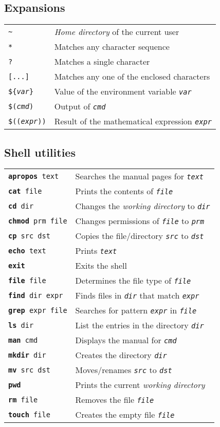 \documentclass[landscape, a4paper]{article}
\newcommand{\cl}[1]{\texttt{#1}}
\newcommand{\cv}[1]{\textit{\texttt{#1}}}
\newcommand{\shcmd}[2]{\texttt{\textbf{#1} #2}}
\begin{document}
\begin{multicols*}{3}
\subsection*{Expansions}
\begin{tabular}{ll}
\cl{\textasciitilde}    & \textit{Home directory} of the current user\\
\cl{*}                  & Matches any character sequence\\
\cl{?}                  & Matches a single character\\
\cl{[...]}              & Matches any one of the enclosed characters\\
\cl{\$\{\cv{var}\cl\}}  & Value of the environment variable \cv{var}\\
\cl{\$(\cv{cmd})}       & Output of \cv{cmd}\\
\cl{\$((\cv{expr}))}    & Result of the mathematical expression \cv{expr}
\end{tabular}

\subsection*{Shell utilities}
\begin{tabular}{ll}
\shcmd{apropos}{text}       & Searches the manual pages for \cv{text}\\
\shcmd{cat}{file}           & Prints the contents of \cv{file}\\
\shcmd{cd}{dir}             & Changes the \textit{working directory} to \cv{dir}\\
\shcmd{chmod}{prm file}     & Changes permissions of \cv{file} to \cv{prm}\\
\shcmd{cp}{src dst}         & Copies the file/directory \cv{src} to \cv{dst}\\
\shcmd{echo}{text}          & Prints \cv{text}\\
\shcmd{exit}{}              & Exits the shell\\
\shcmd{file}{file}          & Determines the file type of \cv{file}\\
\shcmd{find}{dir expr}      & Finds files in \cv{dir} that match \cv{expr}\\
\shcmd{grep}{expr file}     & Searches for pattern \cv{expr} in \cv{file}\\
\shcmd{ls}{dir}             & List the entries in the directory \cv{dir}\\
\shcmd{man}{cmd}            & Displays the manual for \cv{cmd}\\
\shcmd{mkdir}{dir}          & Creates the directory \cv{dir}\\
\shcmd{mv}{src dst}         & Moves/renames \cv{src} to \cv{dst}\\
\shcmd{pwd}{}               & Prints the current \textit{working directory}\\
\shcmd{rm}{file}            & Removes the file \cv{file}\\
\shcmd{touch}{file}         & Creates the empty file \cv{file}
\end{tabular}

\end{multicols*}
\end{document}

